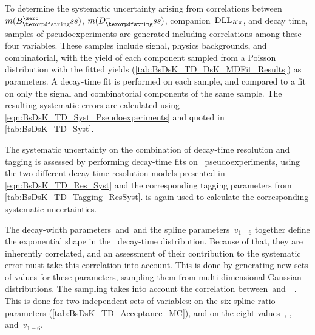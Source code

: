 To determine the systematic uncertainty arising from correlations between~\({m(\Bs)}\), \({m(\Dsm)}\), companion~\(\text{DLL}_{{K}{\pi}}\), and decay time, samples of pseudoexperiments are generated including correlations among these four variables.
These samples include signal, physics backgrounds, and combinatorial, with the yield of each component sampled from a Poisson distribution with the fitted yields (\cref{tab:BsDsK_TD_DsK_MDFit_Results}) as parameters.
A decay-time fit is performed on each sample, and compared to a fit on only the signal and combinatorial components of the same sample.
The resulting systematic errors are calculated using \cref{eqn:BsDsK_TD_Syst_Pseudoexperiments} and quoted in \cref{tab:BsDsK_TD_Syst}.

The systematic uncertainty on the combination of decay-time resolution and tagging is assessed by performing decay-time fits on \BsDsK~pseudoexperiments, using the two different decay-time resolution models presented in \cref{eqn:BsDsK_TD_Res_Syst} and the corresponding tagging parameters from \cref{tab:BsDsK_TD_Tagging_ResSyst}.
 is again used to calculate the corresponding systematic uncertainties.

The decay-width parameters~\Gs and~\DGs and the spline parameters~\(v_{1-6}\) together define the exponential shape in the \Bs~decay-time distribution.
Because of that, they are inherently correlated, and an assessment of their contribution to the systematic error must take this correlation into account.
This is done by generating new sets of values for these parameters, sampling them from multi-dimensional Gaussian distributions.
The sampling takes into account the correlation between~\Gs and~\DGs~\cite{HFLAV2016}.
This is done for two independent sets of variables: on the six spline ratio parameters (\cref{tab:BsDsK_TD_Acceptance_MC}), and on the eight values~\Gs, \DGs, and~\(v_{1-6}\).

